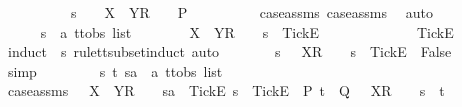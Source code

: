 \begin{isabellebody}
\ \ \ \ \ \ \ \ \ \ s\ {\isacharat}\ {\isasymrho}{\isacharprime}\ {\isacharat}\ {\isacharbrackleft}X\ {\isasymunion}\ Y{\isacharbrackright}\isactrlsub R\ {\isacharhash}\ {\isasymsigma}\ {\isasymin}\ P{\isachardoublequoteclose}\isanewline
\ \ \ \ \ \ \ \ \isamarkupfalse%
\ case{\isacharunderscore}assms\ case{\isacharunderscore}assms{}\ \isamarkupfalse%
\ auto\isanewline
\ \ \ \ \isamarkupfalse%
\isanewline
\ \ \isamarkupfalse%
\isanewline
\ \ \ \ \isamarkupfalse%
\ s\ {\isacharcolon}{\isacharcolon}\ {\isachardoublequoteopen}{\isacharprime}a\ ttobs\ list{\isachardoublequoteclose}\isanewline
\ \ \ \ \isamarkupfalse%
\ {\isachardoublequoteopen}{\isasymrho}\ {\isacharat}\ {\isacharbrackleft}X\ {\isasymunion}\ Y{\isacharbrackright}\isactrlsub R\ {\isacharhash}\ {\isasymsigma}\ {\isacharequal}\ s\ {\isacharat}\ {\isacharbrackleft}{\isacharbrackleft}Tick{\isacharbrackright}\isactrlsub E{\isacharbrackright}{\isachardoublequoteclose}\isanewline
\ \ \ \ \isamarkupfalse%
\ \isamarkupfalse%
\ {\isasymsigma}{\isacharprime}\ \ {\isachardoublequoteopen}{\isasymsigma}\ {\isacharequal}\ {\isasymsigma}{\isacharprime}\ {\isacharat}\ {\isacharbrackleft}{\isacharbrackleft}Tick{\isacharbrackright}\isactrlsub E{\isacharbrackright}{\isachardoublequoteclose}\isanewline
\ \ \ \ \ \ \isamarkupfalse%
\ {\isacharparenleft}induct\ {\isasymrho}\ s\ rule{\isacharcolon}tt{\isacharunderscore}subset{\isachardot}induct{\isacharcomma}\ auto{\isacharparenright}\isanewline
\ \ \ \ \isamarkupfalse%
\ \isamarkupfalse%
\ {\isachardoublequoteopen}{\isasymforall}s{\isachardot}\ {\isasymrho}\ {\isacharat}\ {\isacharbrackleft}X{\isacharbrackright}\isactrlsub R\ {\isacharhash}\ {\isasymsigma}\ {\isasymnoteq}\ s\ {\isacharat}\ {\isacharbrackleft}{\isacharbrackleft}Tick{\isacharbrackright}\isactrlsub E{\isacharbrackright}\ {\isasymLongrightarrow}\ False{\isachardoublequoteclose}\isanewline
\ \ \ \ \ \ \isamarkupfalse%
\ simp\isanewline
\ \ \isamarkupfalse%
\isanewline
\ \ \ \ \isamarkupfalse%
\ s\ t\ sa\ {\isacharcolon}{\isacharcolon}\ {\isachardoublequoteopen}{\isacharprime}a\ ttobs\ list{\isachardoublequoteclose}\isanewline
\ \ \ \ \isamarkupfalse%
\ case{\isacharunderscore}assms{\isacharcolon}\ {\isachardoublequoteopen}{\isasymrho}\ {\isacharat}\ {\isacharbrackleft}X\ {\isasymunion}\ Y{\isacharbrackright}\isactrlsub R\ {\isacharhash}\ {\isasymsigma}\ {\isacharequal}\ sa\ {\isacharat}\ {\isacharbrackleft}{\isacharbrackleft}Tick{\isacharbrackright}\isactrlsub E{\isacharbrackright}{\isachardoublequoteclose}\ {\isachardoublequoteopen}s\ {\isacharat}\ {\isacharbrackleft}{\isacharbrackleft}Tick{\isacharbrackright}\isactrlsub E{\isacharbrackright}\ {\isasymin}\ P{\isachardoublequoteclose}\ {\isachardoublequoteopen}t\ {\isasymin}\ Q{\isachardoublequoteclose}\ {\isachardoublequoteopen}{\isasymrho}\ {\isacharat}\ {\isacharbrackleft}X{\isacharbrackright}\isactrlsub R\ {\isacharhash}\ {\isasymsigma}\ {\isacharequal}\ s\ {\isacharat}\ t{\isachardoublequoteclose}\isanewline

\end{isabellebody}
